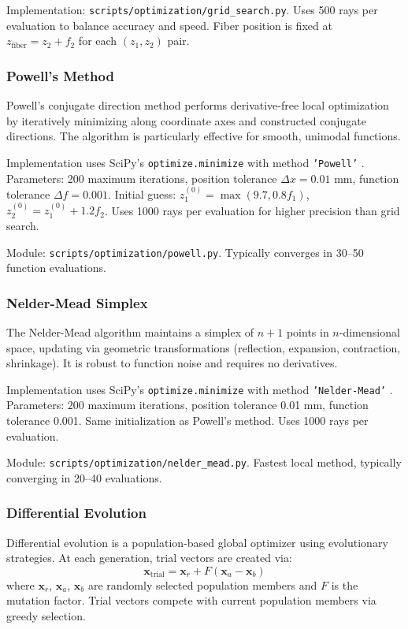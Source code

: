 Implementation: \texttt{scripts/optimization/grid\_search.py}. Uses 500 rays per evaluation to balance accuracy and speed. Fiber position is fixed at $z_{\text{fiber}} = z_2 + f_2$ for each $(z_1, z_2)$ pair.

\subsubsection{Powell's Method}

Powell's conjugate direction method \cite{powell1964} performs derivative-free local optimization by iteratively minimizing along coordinate axes and constructed conjugate directions. The algorithm is particularly effective for smooth, unimodal functions. 

Implementation uses SciPy's \texttt{optimize.minimize} with method \texttt{'Powell'} \cite{scipy}. Parameters: 200 maximum iterations, position tolerance $\Delta x = 0.01$ mm, function tolerance $\Delta f = 0.001$. Initial guess: $z_1^{(0)} = \max(9.7, 0.8f_1)$, $z_2^{(0)} = z_1^{(0)} + 1.2f_2$. Uses 1000 rays per evaluation for higher precision than grid search.

Module: \texttt{scripts/optimization/powell.py}. Typically converges in 30--50 function evaluations.

\subsubsection{Nelder-Mead Simplex}

The Nelder-Mead algorithm \cite{nelder1965} maintains a simplex of $n+1$ points in $n$-dimensional space, updating via geometric transformations (reflection, expansion, contraction, shrinkage). It is robust to function noise and requires no derivatives.

Implementation uses SciPy's \texttt{optimize.minimize} with method \texttt{'Nelder-Mead'} \cite{scipy}. Parameters: 200 maximum iterations, position tolerance 0.01 mm, function tolerance 0.001. Same initialization as Powell's method. Uses 1000 rays per evaluation.

Module: \texttt{scripts/optimization/nelder\_mead.py}. Fastest local method, typically converging in 20--40 evaluations.

\subsubsection{Differential Evolution}

Differential evolution \cite{storn1997} is a population-based global optimizer using evolutionary strategies. At each generation, trial vectors are created via:
\begin{equation}
\mathbf{x}_{\text{trial}} = \mathbf{x}_r + F(\mathbf{x}_a - \mathbf{x}_b)
\end{equation}
where $\mathbf{x}_r$, $\mathbf{x}_a$, $\mathbf{x}_b$ are randomly selected population members and $F$ is the mutation factor. Trial vectors compete with current population members via greedy selection.

